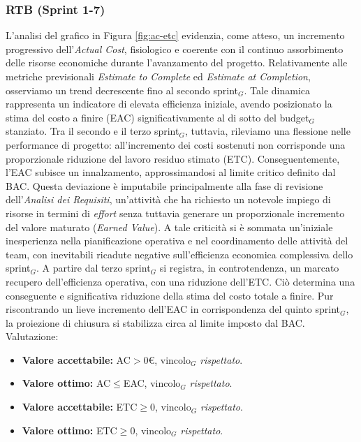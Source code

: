 \documentclass[a4paper, 10pt, colorlinks=true, linkcolor=black, urlcolor=blue, citecolor=blue, hidelinks]{article}
\begin{document}
\subsubsection{RTB (Sprint 1-7)}
L'analisi del grafico in Figura \ref{fig:ac-etc} evidenzia, come atteso, un incremento progressivo dell'\textit{Actual Cost}, fisiologico e coerente con il continuo assorbimento delle risorse economiche durante l'avanzamento del progetto.
Relativamente alle metriche previsionali \textit{Estimate to Complete} ed \textit{Estimate at Completion}, osserviamo un trend decrescente fino al secondo sprint$_G$. Tale dinamica rappresenta un indicatore di elevata efficienza iniziale, avendo posizionato la stima del costo a finire (EAC) significativamente al di sotto del budget$_G$ stanziato.
Tra il secondo e il terzo sprint$_G$, tuttavia, rileviamo una flessione nelle performance di progetto: all'incremento dei costi sostenuti non corrisponde una proporzionale riduzione del lavoro residuo stimato (ETC). Conseguentemente, l'EAC subisce un innalzamento, approssimandosi al limite critico definito dal BAC. Questa deviazione è imputabile principalmente alla fase di revisione dell'\textit{Analisi dei Requisiti}, un'attività che ha richiesto un notevole impiego di risorse in termini di \textit{effort} senza tuttavia generare un proporzionale incremento del valore maturato (\textit{Earned Value}). A tale criticità si è sommata un'iniziale inesperienza nella pianificazione operativa e nel coordinamento delle attività del team, con inevitabili ricadute negative sull'efficienza economica complessiva dello sprint$_G$.
A partire dal terzo sprint$_G$ si registra, in controtendenza, un marcato recupero dell'efficienza operativa, con una riduzione dell'ETC. Ciò determina una conseguente e significativa riduzione della stima del costo totale a finire. Pur riscontrando un lieve incremento dell'EAC in corrispondenza del quinto sprint$_G$, la proiezione di chiusura si stabilizza circa al limite imposto dal BAC. Valutazione:
\begin{itemize}
    \item \textbf{Valore accettabile:} AC$>0$€, vincolo$_G$ \textit{rispettato}.
    \item \textbf{Valore ottimo:} AC$\leq$EAC, vincolo$_G$ \textit{rispettato}.
    \item \textbf{Valore accettabile:} ETC$\geq 0$, vincolo$_G$ \textit{rispettato}.
    \item \textbf{Valore ottimo:} ETC$\geq 0$, vincolo$_G$ \textit{rispettato}.
\end{itemize}
\end{document}
